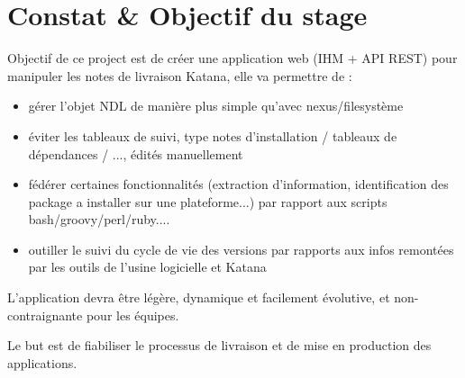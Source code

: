 \section{Constat \& Objectif du stage}
Objectif de ce project est de créer une application web (IHM + API REST) pour manipuler les notes de livraison Katana, elle va permettre de :

\begin{itemize}
 \item gérer l'objet NDL de manière plus simple qu'avec nexus/filesystème
 \item éviter les tableaux de suivi, type notes d'installation / tableaux de dépendances / ..., édités manuellement
 \item fédérer certaines fonctionnalités (extraction d'information, identification des package a installer sur une plateforme...) par rapport aux scripts bash/groovy/perl/ruby....
 \item  outiller le suivi du cycle de vie des versions par rapports aux infos remontées par les outils de l'usine logicielle et Katana
\end{itemize}

L’application devra être légère, dynamique et facilement évolutive, et non-contraignante pour les équipes.

Le but est de fiabiliser le processus de livraison et de mise en production des applications.
\clearpage
